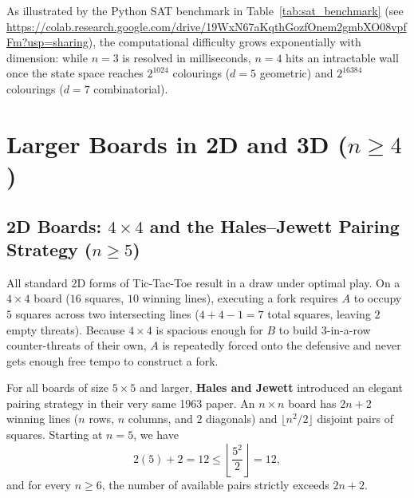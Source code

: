 \documentclass[11pt, a4paper]{article}
\begin{document}
As illustrated by the Python SAT benchmark in Table~\ref{tab:sat_benchmark} (see \url{https://colab.research.google.com/drive/19WxN67aKqthGozfOnem2gmbXO08vpfFm?usp=sharing}), the computational difficulty grows exponentially with dimension: while $n = 3$ is resolved in milliseconds, $n = 4$ hits an intractable wall once the state space reaches $2^{1024}$ colourings ($d = 5$ geometric) and $2^{16384}$ colourings ($d = 7$ combinatorial).

\section{Larger Boards in 2D and 3D ($n \ge 4$)}

\subsection{2D Boards: $4 \times 4$ and the Hales--Jewett Pairing Strategy ($n \ge 5$)}
All standard 2D forms of Tic-Tac-Toe result in a draw under optimal play. On a $4 \times 4$ board ($16$ squares, $10$ winning lines), executing a fork requires $A$ to occupy $5$ squares across two intersecting lines ($4 + 4 - 1 = 7$ total squares, leaving $2$ empty threats). Because $4 \times 4$ is spacious enough for $B$ to build $3$-in-a-row counter-threats of their own, $A$ is repeatedly forced onto the defensive and never gets enough free tempo to construct a fork.

For all boards of size $5 \times 5$ and larger, \textbf{Hales and Jewett} introduced an elegant pairing strategy in their very same 1963 paper. An $n \times n$ board has $2n + 2$ winning lines ($n$ rows, $n$ columns, and $2$ diagonals) and $\lfloor n^2 / 2 \rfloor$ disjoint pairs of squares. Starting at $n = 5$, we have
\[
2(5) + 2 = 12 \le \left\lfloor \frac{5^2}{2} \right\rfloor = 12,
\]
and for every $n \ge 6$, the number of available pairs strictly exceeds $2n + 2$.
\end{document}
